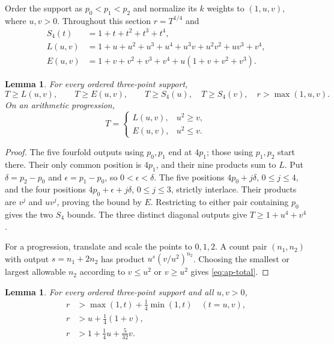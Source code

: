 \documentclass[11pt,a4paper]{article}
\newtheorem{lemma}[theorem]{Lemma}
\theoremstyle{remark}
\begin{document}
Order the support as $p_0<p_1<p_2$ and normalize its $k$ weights to
$(1,u,v)$, where $u,v>0$. Throughout this section $r=T^{1/4}$ and
\begin{align*}
 S_4(t)&=1+t+t^2+t^3+t^4,\\
 L(u,v)&=1+u+u^2+u^3+u^4+u^3v+u^2v^2+uv^3+v^4,\\
 E(u,v)&=1+v+v^2+v^3+v^4+u(1+v+v^2+v^3).
\end{align*}

\begin{lemma}\label{lem:outputs}
For every ordered three-point support,
\[
 T\ge L(u,v),\qquad T\ge E(u,v),\qquad
 T\ge S_4(u),\quad T\ge S_4(v),\quad r>\max(1,u,v).
\]
On an arithmetic progression,
\begin{equation}\label{eq:ap-total}
 T=\begin{cases}L(u,v),&u^2\ge v,\\E(u,v),&u^2\le v.\end{cases}
\end{equation}
\end{lemma}

\begin{proof}
The five fourfold outputs using $p_0,p_1$ end at $4p_1$; those using
$p_1,p_2$ start there. Their only common position is $4p_1$, and their
nine products sum to $L$. Put $\delta=p_2-p_0$ and
$\epsilon=p_1-p_0$, so $0<\epsilon<\delta$.
The five positions $4p_0+j\delta$, $0\le j\le4$, and the four positions
$4p_0+\epsilon+j\delta$, $0\le j\le3$, strictly interlace. Their
products are $v^j$ and $uv^j$, proving the bound by $E$.
Restricting to either pair containing $p_0$ gives the two $S_4$ bounds.
The three distinct diagonal outputs give $T\ge1+u^4+v^4$.

For a progression, translate and scale the points to $0,1,2$.
A count pair $(n_1,n_2)$ with output $s=n_1+2n_2$ has product
$u^s(v/u^2)^{n_2}$. Choosing the smallest or largest allowable $n_2$
according to $v\le u^2$ or $v\ge u^2$ gives \eqref{eq:ap-total}.
\end{proof}

\begin{lemma}\label{lem:affine}
For every ordered three-point support and all $u,v>0$,
\begin{align}
 r&>\max(1,t)+\tfrac14\min(1,t)\quad(t=u,v),\label{eq:binary-scalar}\\
 r&>u+\tfrac14(1+v),\label{eq:middle-scalar}\\
 r&>1+\tfrac14u+\tfrac5{32}v.\label{eq:endpoint-scalar}
\end{align}
\end{lemma}
\end{document}
